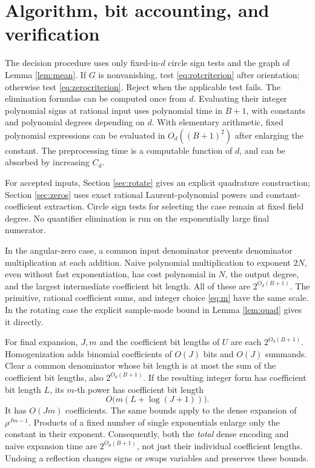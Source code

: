 \documentclass[11pt]{article}
\theoremstyle{remark}\newtheorem{remark}[theorem]{Remark}
\newcommand{\se}{2^{O_d(B+1)}}
\begin{document}
\section{Algorithm, bit accounting, and verification}\label{sec:complexity}

The decision procedure uses only fixed-in-\(d\) circle sign tests and the graph of Lemma \ref{lem:mean}. If \(G\) is nonvanishing, test \eqref{eq:rotcriterion} after orientation; otherwise test \eqref{eq:zerocriterion}. Reject when the applicable test fails. The elimination formulas can be computed once from \(d\). Evaluating their integer polynomial signs at rational input uses polynomial time in \(B+1\), with constants and polynomial degrees depending on \(d\). With elementary arithmetic, fixed polynomial expressions can be evaluated in \(O_d((B+1)^2)\) after enlarging the constant. The preprocessing time is a computable function of \(d\), and can be absorbed by increasing \(C_d\).

For accepted inputs, Section \ref{sec:rotate} gives an explicit quadrature construction; Section \ref{sec:zeros} uses exact rational Laurent-polynomial powers and constant-coefficient extraction. Circle sign tests for selecting the case remain at fixed field degree. No quantifier elimination is run on the exponentially large final numerator.

In the angular-zero case, a common input denominator prevents denominator multiplication at each addition. Naive polynomial multiplication to exponent \(2N\), even without fast exponentiation, has cost polynomial in \(N\), the output degree, and the largest intermediate coefficient bit length. All of these are \(\se\). The primitive, rational coefficient sums, and integer choice \eqref{eq:m} have the same scale. In the rotating case the explicit sample-mode bound in Lemma \ref{lem:quad} gives it directly.

For final expansion, \(J,m\) and the coefficient bit lengths of \(U\) are each \(\se\).
Homogenization adds binomial coefficients of \(O(J)\) bits and \(O(J)\) summands. Clear a common denominator whose bit length is at most the sum of the coefficient bit lengths, also \(\se\). If the resulting integer form has coefficient bit length \(L\), its \(m\)-th power has coefficient bit length
\[
                         O\bigl(m(L+\log(J+1))\bigr).
\]
It has \(O(Jm)\) coefficients. The same bounds apply to the dense expansion of \(\rho^{Jm-1}\). Products of a fixed number of single exponentials enlarge only the constant in their exponent. Consequently, both the \emph{total} dense encoding and naive expansion time are \(\se\), not just their individual coefficient lengths. Undoing a reflection changes signs or swaps variables and preserves these bounds.
\end{document}
